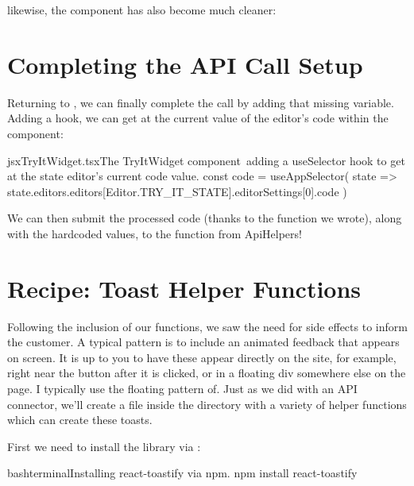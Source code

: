 \documentclass[paper=6in:9in,pagesize=pdftex,headinclude=on,footinclude=on,12pt,twoside]{scrbook}
\begin{document}
likewise, the  component has also become much cleaner:


\section{Completing the API Call Setup}

Returning to , we can finally complete the call by adding that missing  variable. Adding a  hook, we can get at the current value of the editor's code within the  component: 

\begin{codeInput}{jsx}{TryItWidget.tsx}{The TryItWidget component\, adding a useSelector hook to get at the state editor's current code value.}
const code = useAppSelector(
  state => state.editors.editors[Editor.TRY_IT_STATE].editorSettings[0].code
)
\end{codeInput}

We can then submit the processed code (thanks to the  function we wrote), along with the hardcoded values, to the  function from ApiHelpers!

\section{Recipe: Toast Helper Functions}

Following the inclusion of our  functions, we saw the need for side effects to inform the customer. A typical pattern is to include an animated feedback that appears on screen. It is up to you to have these appear directly on the site, for example, right near the button after it is clicked, or in a floating div somewhere else on the page. I typically use the floating pattern of. Just as we did with an API connector, we'll create a file  inside the  directory with a variety of helper functions which can create these toasts.


First we need to install the  library via :

\begin{codeInput}{bash}{terminal}{Installing react-toastify via npm.}
npm install react-toastify
\end{codeInput}
\end{document}
